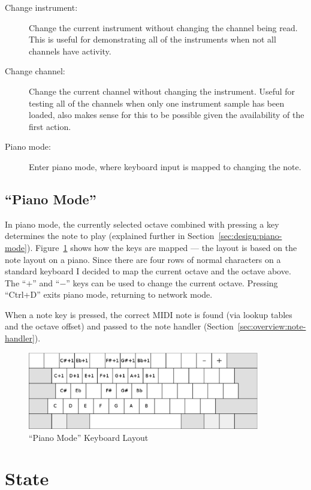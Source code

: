 \begin{description}
\item[Change instrument:] Change the current instrument without changing the channel being read.  
This is useful for demonstrating all of the instruments when not all channels have activity.
\item[Change channel:] Change the current channel without changing the instrument.  Useful for 
testing all of the channels when only one instrument sample has been loaded, also makes sense for 
this to be possible given the availability of the first action.
\item[Piano mode:] Enter piano mode, where keyboard input is mapped to changing the note.
\end{description}

\subsection{``Piano Mode''}

In piano mode, the currently selected octave combined with pressing a key determines the note to 
play (explained further in Section~\ref{sec:design:piano-mode}).  Figure~\ref{fig:piano-mode} shows 
how the keys are mapped --- the layout is based on the note layout on a piano.  Since there are four 
rows of normal characters on a standard keyboard I decided to map the current octave and the octave 
above.  The ``$+$'' and ``$-$'' keys can be used to change the current octave.  Pressing ``Ctrl+D'' 
exits piano mode, returning to network mode.

When a note key is pressed, the correct MIDI note is found (via lookup tables and the octave offset) 
and passed to the note handler (Section~\ref{sec:overview:note-handler}).

\begin{figure}[htb]
\centering
\includegraphics[width=0.9\textwidth]{images/piano-mode}
\caption{``Piano Mode'' Keyboard Layout}\label{fig:piano-mode}
\end{figure}

\section{State}
\label{sec:overview:state}

